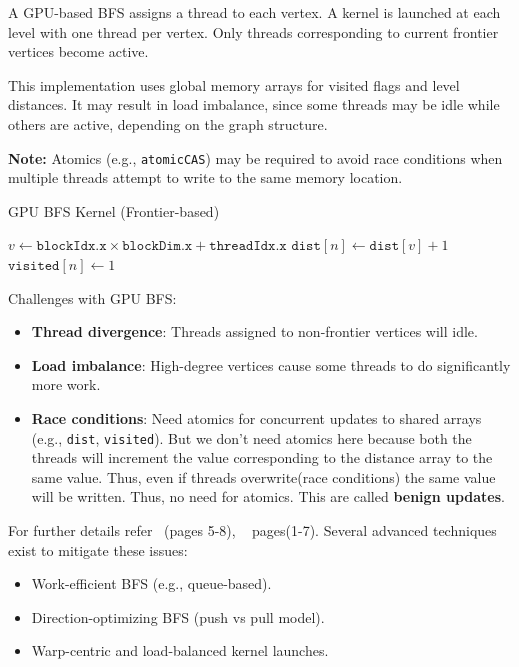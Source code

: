 \documentclass[12pt]{book}
\begin{document}
A GPU-based BFS assigns a thread to each vertex. A kernel is launched at each level with one thread per vertex. Only threads corresponding to current frontier vertices become active.

This implementation uses global memory arrays for visited flags and level distances. It may result in load imbalance, since some threads may be idle while others are active, depending on the graph structure.

\textbf{Note:} Atomics (e.g., \texttt{atomicCAS}) may be required to avoid race conditions when multiple threads attempt to write to the same memory location.

\begin{algorithm}[H]
\caption{GPU BFS Kernel (Frontier-based)}
\label{alg:GPUBFS}
\begin{algorithmic}[1]
    \State $v \gets \texttt{blockIdx.x} \times \texttt{blockDim.x} + \texttt{threadIdx.x}$
                \State $\texttt{dist}[n] \gets \texttt{dist}[v] + 1$
                \State $\texttt{visited}[n] \gets 1$
            \EndIf
        \EndFor
    \EndIf
\EndProcedure
\end{algorithmic}
\end{algorithm}

\noindent
Challenges with GPU BFS:
\begin{itemize}
    \item \textbf{Thread divergence}: Threads assigned to non-frontier vertices will idle.
    \item \textbf{Load imbalance}: High-degree vertices cause some threads to do significantly more work.
    \item \textbf{Race conditions}: Need atomics for concurrent updates to shared arrays (e.g., \texttt{dist}, \texttt{visited}). But we don't need atomics here because both the threads will increment the value corresponding to the distance array to the same value. Thus, even if threads overwrite(race conditions) the same value will be written. Thus, no need for atomics. This are called \textbf{benign updates}.
\end{itemize}
For further details refer~\cite{harish2007accelerating} (pages 5-8), ~\cite{yoo2005scalable} pages(1-7).
\bigskip
\noindent
Several advanced techniques exist to mitigate these issues:
\begin{itemize}
    \item Work-efficient BFS (e.g., queue-based).
    \item Direction-optimizing BFS (push vs pull model).
    \item Warp-centric and load-balanced kernel launches.
\end{itemize}
\end{document}
